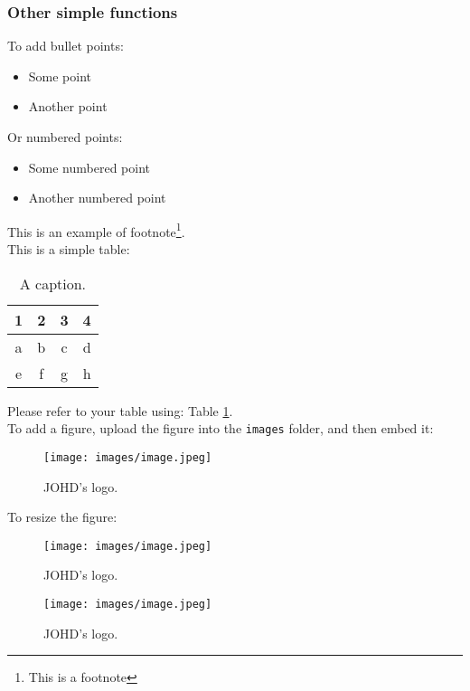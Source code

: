 \documentclass{article}
\begin{document}
\subsubsection{Other simple functions}
To add bullet points:

\begin{itemize}
    \item Some point
    \item Another point
\end{itemize}

\noindent Or numbered points:

\begin{itemize}
    \item[1.] Some numbered point
    \item[2.] Another numbered point
\end{itemize}

\noindent This is an example of footnote\footnote{This is a footnote}. \\

\noindent This is a simple table:

\begin{table}[H]
\centering %
\caption{\label{tab1} A caption.}
\begin{tabular}{cccc}
\hline
1 & 2 & 3 & 4 \\
\hline
a & b & c & d\\
e & f & g & h\\
\hline
\end{tabular}
\end{table}

\noindent Please refer to your table using: Table \ref{tab1}.\\

\noindent To add a figure, upload the figure into the \texttt{images} folder, and then embed it:

\begin{figure}[H]
\centering
\texttt{[image: images/image.jpeg]}
\caption{\label{fig1}JOHD's logo.}
\end{figure}

\noindent To resize the figure:

\begin{figure}[H]
\centering
\texttt{[image: images/image.jpeg]}
\caption{\label{fig2}JOHD's logo.}
\end{figure}

\begin{figure}[H]
\centering
\texttt{[image: images/image.jpeg]}
\caption{\label{fig3}JOHD's logo.}
\end{figure}
\end{document}
